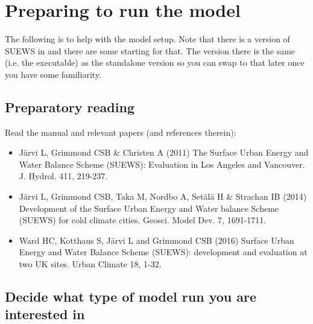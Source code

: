 \documentclass[letterpaper,10pt,english]{sphinxmanual}
\begin{document}
\chapter{Preparing to run the model}
\label{\detokenize{prepare-to-run-the-model::doc}}\label{\detokenize{prepare-to-run-the-model:preparing-to-run-the-model}}\label{\detokenize{prepare-to-run-the-model:id1}}
The following is to help with the model setup. Note that there is a
version of SUEWS in 
and there are some starting
 for
that. The version there is the same (i.e. the executable) as the
standalone version so you can swap to that later once you have some
familiarity.


\section{Preparatory reading}
\label{\detokenize{prepare-to-run-the-model:preparatory-reading}}
Read the manual and relevant papers (and references therein):
\begin{itemize}
\item {} 
Järvi L, Grimmond CSB \& Christen A (2011) The Surface Urban Energy
and Water Balance Scheme (SUEWS): Evaluation in Los Angeles and
Vancouver. J. Hydrol. 411, 219-237.

\item {} 
Järvi L, Grimmond CSB, Taka M, Nordbo A, Setälä H \& Strachan IB
(2014) Development of the Surface Urban Energy and Water balance
Scheme (SUEWS) for cold climate cities. Geosci. Model Dev. 7,
1691-1711.

\item {} 
Ward HC, Kotthaus S, Järvi L and Grimmond CSB (2016) Surface Urban
Energy and Water Balance Scheme (SUEWS): development and evaluation
at two UK sites. Urban Climate 18, 1-32.

\end{itemize}



\section{Decide what type of model run you are interested in}
\label{\detokenize{prepare-to-run-the-model:decide-what-type-of-model-run-you-are-interested-in}}
\end{document}
